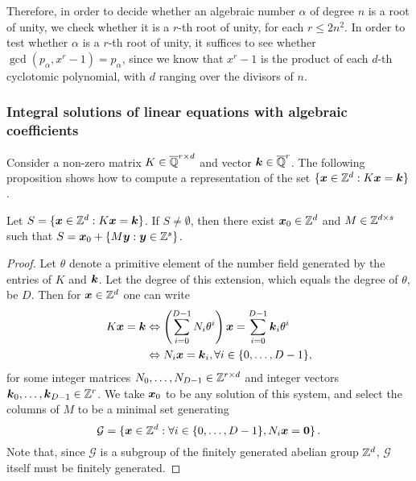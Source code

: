 Therefore, in order to decide whether an algebraic number $\alpha$ of degree $n$ is a root of unity, we check whether it is a $r$-th root of unity, for each $r\leq 2n^2$. In order to test whether $\alpha$ is a $r$-th root of unity, it suffices to see whether $\gcd(p_\alpha,x^r-1)=p_\alpha$, since we know that $x^r-1$ is the product of each $d$-th cyclotomic polynomial, with $d$ ranging over the divisors of $n$.

\subsubsection{Integral solutions of linear equations with algebraic coefficients}

Consider a non-zero matrix $K\in\overline{\mathbb{Q}}^{r\times d}$ and vector $\boldsymbol{k} \in \overline{\mathbb{Q}}^r$.  The following proposition shows how to compute a representation of the set $\lbrace \boldsymbol{x} \in \mathbb{Z}^{d} : K\boldsymbol{x} = \boldsymbol{k} \rbrace$.

\begin{proposition}
  Let $S = \lbrace \boldsymbol{x}\in\mathbb{Z}^{d} : K\boldsymbol{x} =
  \boldsymbol{k} \rbrace$. If $S \neq \emptyset$, then there exist
  $\boldsymbol{x}_{0} \in \mathbb{Z}^{d}$ and $M \in \mathbb{Z}^{d \times s}$ such that
  $S = \boldsymbol{x}_{0} + \lbrace M \boldsymbol{y} : \boldsymbol{y} \in \mathbb{Z}^s \rbrace$.
\end{proposition}

\begin{proof}
  Let $\theta$ denote a primitive element of the number field
  generated by the entries of $K$ and $\boldsymbol{k}$. Let the degree of this extension, which equals the degree of $\theta$, be $D$. Then for $\boldsymbol{x} \in \mathbb{Z}^{d}$ one can write
\begin{align*}
K \boldsymbol{x} = \boldsymbol{k} &\Leftrightarrow \left( \sum \limits_{i=0}^{D-1} N_{i} \theta^{i} \right) \boldsymbol{x} = \sum \limits_{i=0}^{D-1} \boldsymbol{k}_{i} \theta^{i} \\
&\Leftrightarrow N_{i} \boldsymbol{x} = \boldsymbol{k}_{i}, \forall i \in \lbrace 0, \ldots, D-1 \rbrace ,
\end{align*}
for some integer matrices $N_{0}, \ldots, N_{D-1} \in \mathbb{Z}^{r \times d}$ and integer vectors $\boldsymbol{k}_{0}, \ldots, \boldsymbol{k}_{D-1} \in \mathbb{Z}^{r}$.
We take $\boldsymbol{x}_{0}$ to be any solution of this system, and select the columns of $M$ to be a minimal set generating
\begin{equation*}
\mathcal{G} = \lbrace \boldsymbol{x} \in \mathbb{Z}^{d} : \forall i \in \lbrace 0, \ldots, D-1 \rbrace, N_{i} \boldsymbol{x} = \boldsymbol{0} \rbrace \, .
\end{equation*}
Note that, since $\mathcal{G}$ is a subgroup of the finitely generated abelian group $\mathbb{Z}^{d}$, $\mathcal{G}$ itself must be finitely generated.
\end{proof}
